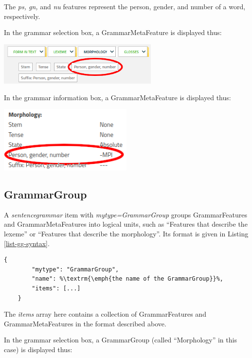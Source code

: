 \documentclass[11pt,oneside,a4paper]{memoir}
\begin{document}
The \emph{ps, gn,} and \emph{nu} features represent the person, gender, and number of a word,
respectively.


\Needspace*{5cm}%
In the grammar selection box, a GrammarMetaFeature is displayed thus:

\begin{center}
  \includegraphics[width=0.6\textwidth]{pgn1.png}
\end{center}

\Needspace*{5cm}%
In the grammar information box, a GrammarMetaFeature is displayed thus:

\begin{center}
  \includegraphics[width=0.5\textwidth]{pgn2.png}
\end{center}


\subsection{GrammarGroup}\label{sec-grammargroup}

A \emph{sentencegrammar} item with \emph{mytype=GrammarGroup} groups GrammarFeatures and
GrammarMetaFeatures into logical units, such as ``Features that describe the lexeme'' or ``Features
that describe the morphology''. Its format is given in Listing \ref{list-gg-syntax}.

\begin{lstlisting}[caption=GrammarGroup syntax,label=list-gg-syntax]
    {
        "mytype": "GrammarGroup",
        "name": %\textrm{\emph{the name of the GrammarGroup}}%,
        "items": [...]
    }
\end{lstlisting}

The \emph{items} array here contains a collection of GrammarFeatures and GrammarMetaFeatures in the
format described above.

\Needspace*{5cm}%
In the grammar selection box, a GrammarGroup (called ``Morphology'' in
this case) is displayed thus:
\end{document}
